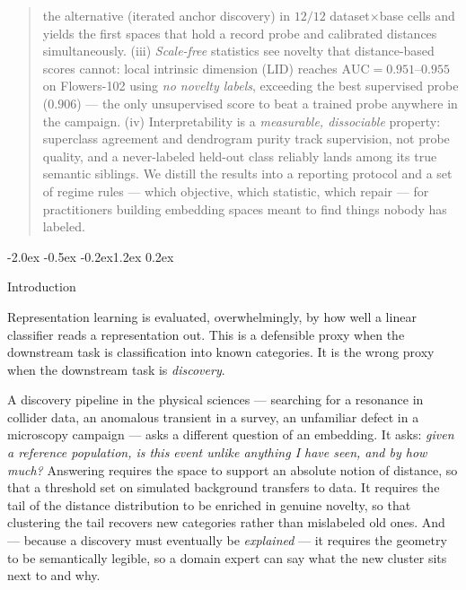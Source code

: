 \documentclass{article}
\makeatletter
\renewcommand\section{\@startsection{section}{1}{\z@}%
  {-2.0ex \@plus -0.5ex \@minus -0.2ex}{1.2ex \@plus 0.2ex}%
  {\large\bf\raggedright}}
\newcommand{\auc}{\mathrm{AUC}}
\makeatother
\begin{document}
\begin{abstract}
the alternative (iterated anchor discovery) in $12/12$ dataset$\times$base
cells and yields the first spaces that hold a record probe and calibrated
distances simultaneously. (iii) \emph{Scale-free} statistics see novelty that
distance-based scores cannot: local intrinsic dimension (LID) reaches
$\auc=0.951$--$0.955$ on Flowers-102 using \emph{no novelty labels}, exceeding
the best supervised probe ($0.906$) --- the only unsupervised score to beat a
trained probe anywhere in the campaign. (iv) Interpretability is a
\emph{measurable, dissociable} property: superclass agreement and dendrogram
purity track supervision, not probe quality, and a never-labeled held-out class
reliably lands among its true semantic siblings. We distill the results into a
reporting protocol and a set of regime rules --- which objective, which
statistic, which repair --- for practitioners building embedding spaces meant
to find things nobody has labeled.
\end{abstract}

\section{Introduction}

Representation learning is evaluated, overwhelmingly, by how well a linear
classifier reads a representation out. This is a defensible proxy when the
downstream task is classification into known categories. It is the wrong proxy
when the downstream task is \emph{discovery}.

A discovery pipeline in the physical sciences --- searching for a resonance in
collider data, an anomalous transient in a survey, an unfamiliar defect in a
microscopy campaign --- asks a different question of an embedding. It asks:
\emph{given a reference population, is this event unlike anything I have seen,
and by how much?} Answering requires the space to support an absolute notion of
distance, so that a threshold set on simulated background transfers to data. It
requires the tail of the distance distribution to be enriched in genuine
novelty, so that clustering the tail recovers new categories rather than
mislabeled old ones. And --- because a discovery must eventually be
\emph{explained} --- it requires the geometry to be semantically legible, so a
domain expert can say what the new cluster sits next to and why.
\end{document}
